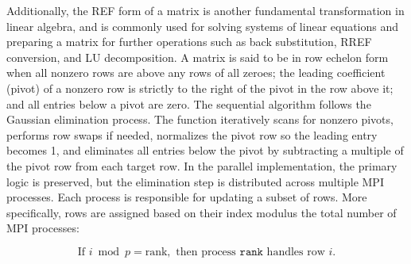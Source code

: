 \documentclass[12pt]{article}
\begin{document}
Additionally, the REF form of a matrix is another fundamental transformation in linear algebra, and is commonly used for solving systems of linear equations and preparing a matrix for further operations such as back substitution, RREF conversion, and LU decomposition. A matrix is said to be in row echelon form when all nonzero rows are above any rows of all zeroes; the leading coefficient (pivot) of a nonzero row is strictly to the right of the pivot in the row above it; and all entries below a pivot are zero. The sequential algorithm follows the Gaussian elimination process. The function iteratively scans for nonzero pivots, performs row swaps if needed, normalizes the pivot row so the leading entry becomes 1, and eliminates all entries below the pivot by subtracting a multiple of the pivot row from each target row. In the parallel implementation, the primary logic is preserved, but the elimination step is distributed across multiple MPI processes. Each process is responsible for updating a subset of rows. More specifically, rows are assigned based on their index modulus the total number of MPI processes:

\[
\text{If } i \bmod p = \text{rank}, \text{ then process } \texttt{rank} \text{ handles row } i.
\]
\end{document}
